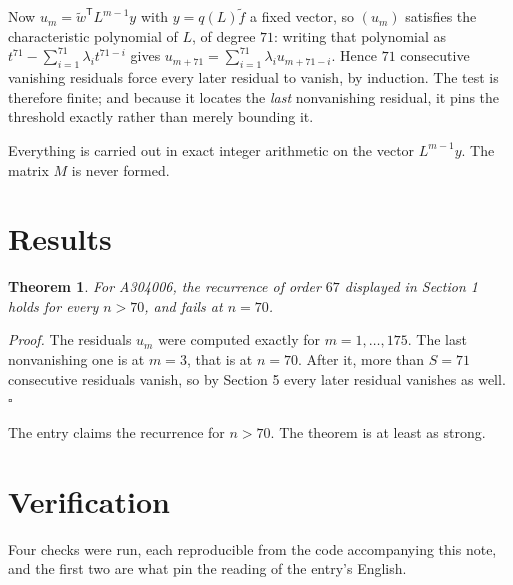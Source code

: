 \documentclass[11pt]{article}
\newtheorem{theorem}{Theorem}
\theoremstyle{definition}
\begin{document}
Now $u_m = \tilde w^{\mathsf T} L^{m-1} y$ with $y = q(L)\tilde f$ a fixed vector, so $(u_m)$ satisfies the characteristic polynomial of $L$, of degree $71$: writing that polynomial as $t^{71} - \sum_{i=1}^{71} \lambda_i t^{71-i}$ gives $u_{m+71} = \sum_{i=1}^{71} \lambda_i u_{m+71-i}$. Hence $71$ consecutive vanishing residuals force every later residual to vanish, by induction. The test is therefore finite; and because it locates the {\itshape last} nonvanishing residual, it pins the threshold exactly rather than merely bounding it.

Everything is carried out in exact integer arithmetic on the vector $L^{m-1}y$. The matrix $M$ is never formed.

\section{Results}

\begin{theorem} For A304006, the recurrence of order $67$ displayed in Section 1 holds for every $n > 70$, and fails at $n = 70$.\end{theorem}

{\itshape Proof.} The residuals $u_m$ were computed exactly for $m = 1,\dots,175$. The last nonvanishing one is at $m = 3$, that is at $n = 70$. After it, more than $S = 71$ consecutive residuals vanish, so by Section 5 every later residual vanishes as well. $\square$

The entry claims the recurrence for $n > 70$. The theorem is at least as strong.

\section{Verification}

Four checks were run, each reproducible from the code accompanying this note, and the first two are what pin the reading of the entry's English.
\end{document}
